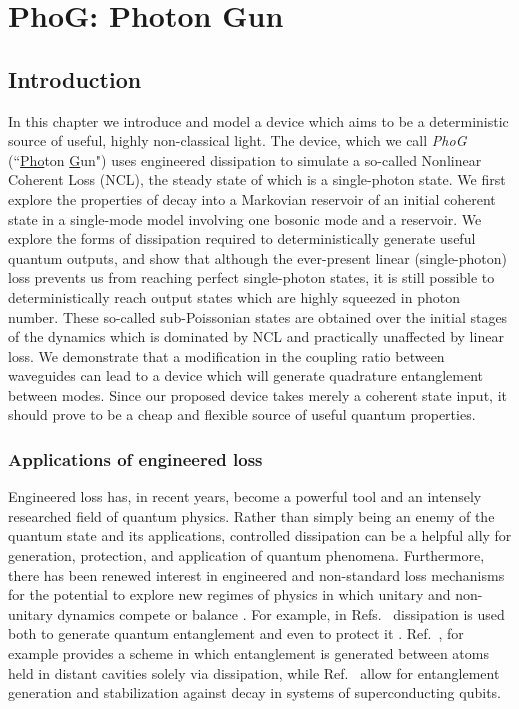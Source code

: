 %
%
%
%
%

\chapter{PhoG: Photon Gun}\label{chapter:phog}

\section{Introduction}


In this chapter we introduce and model a device which aims to be a deterministic source of useful, highly non-classical light. The device, which we call \emph{PhoG} (``\underline{Pho}ton \underline{G}un") uses engineered dissipation to simulate a so-called Nonlinear Coherent Loss (NCL), the steady state of which is a single-photon state. We first explore the properties of decay into a Markovian reservoir of an initial coherent state in a single-mode model involving one bosonic mode and a reservoir. We explore the forms of dissipation required to deterministically generate useful quantum outputs, and show that although the ever-present linear (single-photon) loss prevents us from reaching perfect single-photon states, it is still possible to deterministically reach output states which are highly squeezed in photon number. These so-called sub-Poissonian states are obtained over the initial stages of the dynamics which is dominated by NCL and practically unaffected by linear loss. We demonstrate that a modification in the coupling ratio between waveguides can lead to a device which will generate quadrature entanglement between modes. Since our proposed device takes merely a coherent state input, it should prove to be a cheap and flexible source of useful quantum properties.

\subsection{Applications of engineered loss}

Engineered loss has, in recent years, become a powerful tool and an intensely researched field of quantum physics. Rather than simply being an enemy of the quantum state and its applications, controlled dissipation can be a helpful ally for generation, protection, and application of quantum phenomena. Furthermore, there has been renewed interest in engineered and non-standard loss mechanisms for the potential to explore new regimes of physics in which unitary and non-unitary dynamics compete or balance \cite{Ottawa2018a, Lieu2018}. For example, in Refs.~\cite{Wolinsky1988, Braun2002, Clark2003, Roghani2018} dissipation is used both to generate quantum entanglement and even to protect it \cite{Zanardi1997}. Ref.~\cite{Clark2003}, for example provides a scheme in which entanglement is generated between atoms held in distant cavities solely via dissipation, while Ref.~\cite{Kimchi-Schwartz2018} allow for entanglement generation and stabilization against decay in systems of superconducting qubits.

